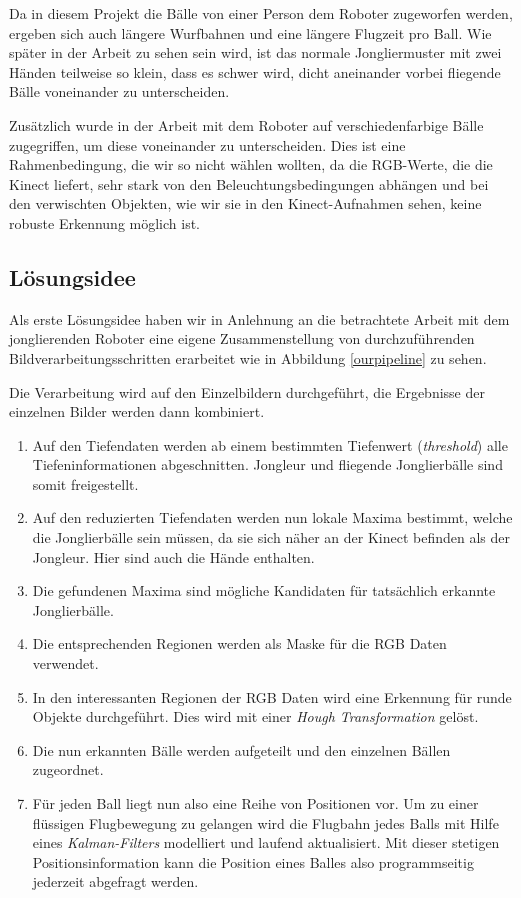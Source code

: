 \documentclass[12pt,a4paper,ngerman]{scrartcl}
\begin{document}
Da in diesem Projekt die Bälle von einer Person dem Roboter zugeworfen werden,
ergeben sich auch längere Wurfbahnen und eine längere Flugzeit pro Ball. Wie
später in der Arbeit zu sehen sein wird, ist das normale Jongliermuster mit zwei
Händen teilweise so klein, dass es schwer wird, dicht aneinander vorbei fliegende
Bälle voneinander zu unterscheiden.

Zusätzlich wurde in der Arbeit mit dem Roboter auf verschiedenfarbige Bälle
zugegriffen, um diese voneinander zu unterscheiden. Dies ist eine Rahmenbedingung,
die wir so nicht wählen wollten, da die RGB-Werte, die die Kinect liefert, sehr stark
von den Beleuchtungsbedingungen abhängen und bei den verwischten Objekten, wie
wir sie in den Kinect-Aufnahmen sehen, keine robuste Erkennung möglich ist.


\subsection{Lösungsidee}

Als erste Lösungsidee haben wir in Anlehnung an die betrachtete Arbeit mit dem
jonglierenden Roboter eine eigene Zusammenstellung von durchzuführenden Bildverarbeitungsschritten
erarbeitet wie in Abbildung \ref{ourpipeline} zu sehen.

Die Verarbeitung wird auf den Einzelbildern durchgeführt, die Ergebnisse der
einzelnen Bilder werden dann kombiniert.

\begin{enumerate}
\item Auf den Tiefendaten werden ab einem bestimmten Tiefenwert (\textit{threshold})
	alle Tiefeninformationen abgeschnitten. Jongleur und fliegende Jonglierbälle sind
	somit freigestellt.
\item Auf den reduzierten Tiefendaten werden nun lokale Maxima bestimmt, welche die
	Jonglierbälle sein müssen, da sie sich näher an der Kinect befinden als der
	Jongleur. Hier sind auch die Hände enthalten.
\item Die gefundenen Maxima sind mögliche Kandidaten für tatsächlich erkannte
	Jonglierbälle.
\item Die entsprechenden Regionen werden als Maske für die RGB Daten verwendet.
\item In den interessanten Regionen der RGB Daten wird eine Erkennung für runde
	Objekte durchgeführt. Dies wird mit einer \textit{Hough Transformation} gelöst.
\item Die nun erkannten Bälle werden aufgeteilt und den einzelnen Bällen zugeordnet.
\item Für jeden Ball liegt nun also eine Reihe von Positionen vor. Um zu einer
	flüssigen Flugbewegung zu gelangen wird die Flugbahn jedes Balls mit Hilfe eines
	\textit{Kalman-Filters} modelliert und laufend aktualisiert. Mit dieser stetigen
	Positionsinformation kann die Position eines Balles also programmseitig jederzeit
	abgefragt werden.
\end{enumerate}
\end{document}
